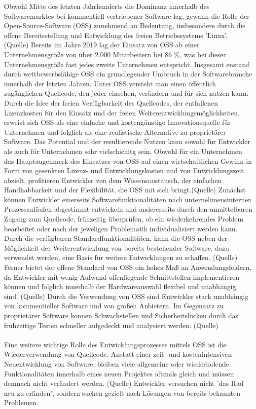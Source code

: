 Obwohl Mitte des letzten Jahrhunderts die Dominanz innerhalb des Softwaremarktes bei kommentiell vertriebener Software lag, gewann die Rolle der Open-Source-Software (OSS) zunehmend an Bedeutung, insbesondere durch die offene Bereitsstellung und Entwicklung des freien Betriebssystems 'Linux'. \cite[S. 1]{will_open-source-software_2003} (Quelle) Bereits im Jahre 2019 lag der Einsatz von OSS ab einer Unternehmensgröße von über 2.000 Mitarbeitern bei 86 \%, was bei dieser Unternehmensgröße fast jedes zweite Unternehmen entspricht. \cite[S. 15]{bitkom_ev_open_2016} Insgesamt enstand durch wettbewerbsfähige OSS ein grundlegender Umbruch in der Softwarebranche innerhalb der letzten Jahren. \cite[S. 185]{bitzer_entwicklung_2007} \cite{fitzgerald_transformation_2006} Unter OSS versteht man einen öffentlich zugänglichen Quellcode, den jeder einsehen, verändern und für sich nutzen kann. Durch die Idee der freien Verfügbarkeit des Quellcodes, der entfallenen Lizenzkosten für den Einsatz und der freien Weiterentwicklungsmöglichkeiten, erweist sich OSS als eine einfache und kostengünstige Innovationsquelle für Unternehmen und folglich als eine realistische Alternative zu proprietärer Software. \cite[S. 21,22]{allmann_open_2019} Das Potential und der resultierende Nutzen kann sowohl für Entwickler als auch für Unternehmen sehr vielschichitg sein. Obwohl für ein Unternehmen das Hauptaugenmerk des Einsatzes von OSS auf einen wirtschaftlichen Gewinn in Form von gesenkten Lizenz- und Entwicklungskosten und von Entwicklungszeit abzielt, profitieren Entwickler von dem Wissensaustausch, der einfachen Handhabbarkeit und der Flexibilität, die OSS mit sich bringt.(Quelle) Zunächst können Entwickler einerseits Softwarefunktionalitäten nach unternehmensinternen Prozessanläufen abgestimmt entwickeln und andererseits durch den unmittelbaren Zugang zum Quellcode, frühzeitig überprüfen, ob ein wiederkehrendes Problem bearbeitet oder nach der jeweligen Problematik individualisiert werden kann. Durch die verfügbaren Standardfunktionalitäten, kann die OSS neben der Möglichkeit der Weiterentwicklung von bereits bestehender Software, dazu verwendet werden, eine Basis für weitere Entwicklungen zu schaffen. (Quelle) Ferner bietet der offene Standard von OSS ein hohes Maß an Anwendungsfeldern, da Entwickler mit wenig Aufwand offenliegende Schnittstellen implementieren können und folglich innerhalb der Hardwareauswahl flexibel und unabhängig sind. (Quelle) Durch die Verwendung von OSS sind Entwickler stark unabhängig von kommentieller Software und von großen Anbietern. Im Gegensatz zu proprietärer Software können Schwachstellen und Sicherheitslücken durch das frühzeitige Testen schneller aufgedeckt und analysiert werden. (Quelle)\\\\ Eine weitere wichtige Rolle des Entwicklungsprozesses mittels OSS ist die Wiederverwendung von Quellcode. Anstatt einer zeit- und kostenintensiven Neuentwicklung von Software, bleiben viele allgemeine oder wiederholende Funktionalitäten innerhalb eines neuen Projektes oftmals gleich und müssen demnach nicht verändert werden. (Quelle) Entwickler versuchen nicht 'das Rad neu zu erfinden', sondern suchen gezielt nach Lösungen von bereits bekannten Problemen. 